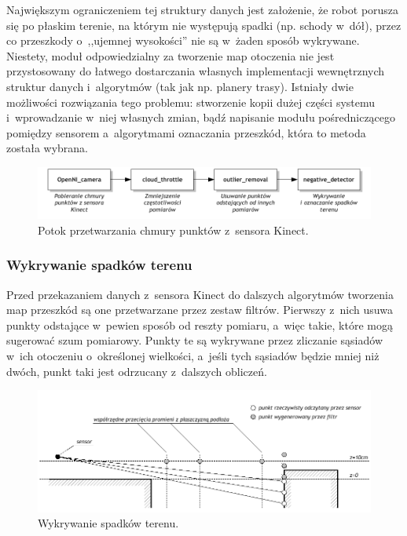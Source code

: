 Największym ograniczeniem tej struktury danych jest założenie, że robot porusza
się po płaskim terenie, na którym nie występują spadki (np. schody w~dół), przez
co przeszkody o~,,ujemnej wysokości'' nie są w~żaden sposób wykrywane. Niestety,
moduł odpowiedzialny za tworzenie map otoczenia nie jest przystosowany do
łatwego dostarczania własnych implementacji wewnętrznych struktur danych
i~algorytmów (tak jak np. planery trasy). Istniały dwie możliwości
rozwiązania tego problemu: stworzenie kopii dużej części systemu i~wprowadzanie
w~niej własnych zmian, bądź napisanie modułu pośredniczącego pomiędzy sensorem
a~algorytmami oznaczania przeszkód, która to metoda została wybrana.

\begin{figure}[htb!]
\centering
\includegraphics{../img/filtering}
\caption{Potok przetwarzania chmury punktów z~sensora Kinect.}
\label{fig:filtering}
\end{figure}

\subsubsection{Wykrywanie spadków terenu}

Przed przekazaniem danych z~sensora Kinect do dalszych algorytmów tworzenia map
przeszkód są one przetwarzane przez zestaw filtrów. Pierwszy z~nich usuwa punkty
odstające w~pewien sposób od reszty pomiaru, a~więc takie, które mogą sugerować
szum pomiarowy. Punkty te są wykrywane przez zliczanie sąsiadów w~ich otoczeniu
o~określonej wielkości, a~jeśli tych sąsiadów będzie mniej niż dwóch, punkt taki
jest odrzucany z~dalszych obliczeń.

\begin{figure}[htb!]
\centering
\includegraphics{../../Common/img/depresion}
\caption{Wykrywanie spadków terenu.}
\label{fig:depresion}
\end{figure}

